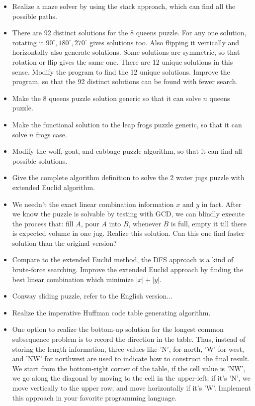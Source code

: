\documentclass[UTF8]{article}
\begin{document}
\begin{Exercise}
\begin{itemize}
\item Realize a maze solver by using the stack approach, which can find all the possible paths.
\item There are 92 distinct solutions for the 8 queens puzzle. For any one solution, rotating it
$90^{\circ}, 180^{\circ}, 270^{\circ}$ gives solutions too. Also flipping it vertically and horizontally
also generate solutions. Some solutions are symmetric, so that rotation or flip gives the same one.
There are 12 unique solutions in this sense. Modify the program to find the 12 unique solutions.
Improve the program, so that the 92 distinct solutions can be found with fewer search.
\item Make the 8 queens puzzle solution generic so that it can solve $n$ queens puzzle.
\item Make the functional solution to the leap frogs puzzle generic, so that it can solve $n$
frogs case.
\item Modify the wolf, goat, and cabbage puzzle algorithm, so that it can find all possible
solutions.
\item Give the complete algorithm definition to solve the 2 water jugs puzzle with extended
Euclid algorithm.
\item We needn't the exact linear combination information $x$ and $y$ in fact. After we know
the puzzle is solvable by testing with GCD, we can blindly execute the process that:
fill $A$, pour $A$ into $B$, whenever $B$ is full, empty it till there is expected volume
in one jug. Realize this solution. Can this one find faster solution than the original
version?
\item Compare to the extended Euclid method, the DFS approach is a kind of brute-force searching.
Improve the extended Euclid approach by finding the best linear combination which minimize
$|x| + |y|$.
\item Conway sliding puzzle, refer to the English version...
\item Realize the imperative Huffman code table generating algorithm.
\item One option to realize the bottom-up solution for the longest common subsequence problem
is to record the direction in the table. Thus, instead of storing the length information,
three values like 'N', for north, 'W' for west, and 'NW' for northwest are used to indicate
how to construct the final result. We start from the bottom-right corner of the table, if
the cell value is 'NW', we go along the diagonal by moving to the cell in the upper-left;
if it's 'N', we move vertically to the upper row; and move horizontally if it's 'W'.
Implement this approach in your favorite programming language.
\end{itemize}
\end{Exercise}
\end{document}

